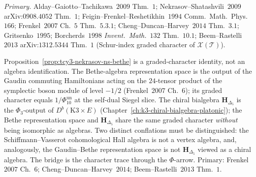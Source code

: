\begin{proposition}
\emph{Primary.} Alday--Gaiotto--Tachikawa~$2009$ Thm.~$1$;
Nekrasov--Shatashvili~$2009$ arXiv:$0908.4052$ Thm.~$1$;
Feigin--Frenkel--Reshetikhin~$1994$ Comm.\ Math.\ Phys.~$166$;
Frenkel~$2007$ Ch.~$5$ Thm.~$5.3.1$;
Cheng--Duncan--Harvey~$2014$ Thm.~$3.1$;
Gritsenko~$1995$; Borcherds~$1998$ \emph{Invent.\ Math.}~$132$
Thm.~$10.1$;
Beem--Rastelli~$2013$ arXiv:$1312.5344$ Thm.~$1$
(Schur-index graded character of $\mathcal X(\mathcal T)$).
\end{proposition}

\begin{remark}
\label{rem:tcy3-nekrasov-character-only-guard}
Proposition~\ref{prop:tcy3-nekrasov-ns-bethe} is a graded-character
identity, not an algebra identification. The Bethe-algebra
representation space is the output of the Gaudin commuting
Hamiltonians acting on the $24$-tensor product of the symplectic
boson module of level $-1/2$ (Frenkel~$2007$ Ch.~$6$); its graded
character equals \(1/\Phi_{10}^{\mathrm{un}}\) at the self-dual Siegel slice. The
chiral bialgebra $\mathbf H_{\Delta_5}$ is the $\Phi_3$-output of
$D^b(\mathrm K3\times E)$ (Chapter~\ref{ch:k3-chiral-bialgebra-platonic});
the Bethe representation space and $\mathbf H_{\Delta_5}$ share the
same graded character \emph{without} being isomorphic as algebras.
Two distinct conflations must be distinguished: the
Schiffmann--Vasserot cohomological Hall algebra is not a vertex
algebra, and, analogously, the Gaudin--Bethe representation space is
not $\mathbf H_{\Delta_5}$ viewed as a chiral algebra. The bridge is
the character trace through the $\Phi$-arrow. Primary: Frenkel~$2007$
Ch.~$6$; Cheng--Duncan--Harvey~$2014$; Beem--Rastelli~$2013$ Thm.~$1$.
\end{remark}

